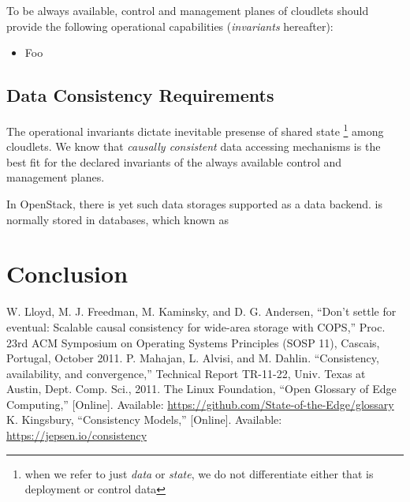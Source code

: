 \documentclass[conference]{IEEEtran}
\begin{document}
To be always available, control and management planes of cloudlets should
provide the following operational capabilities (\textit{invariants} hereafter):

\begin{itemize}
\item Foo
\end{itemize}

\subsection{Data Consistency Requirements}

The operational invariants dictate inevitable presense of shared state
\footnote{when we refer to just \textit{data} or \textit{state}, we do not
differentiate either that is deployment or control data} among cloudlets. We
know \cite{b4} that \textit{causally consistent} \cite{b1}\cite{b2}
data accessing mechanisms is the best fit for the declared invariants of the
always available control and management planes.

In OpenStack, there is yet such data storages supported as a data
backend. is normally stored in databases, which known as

\section{Conclusion}

\begin{thebibliography}{00}
 W. Lloyd, M. J. Freedman, M. Kaminsky, and D. G. Andersen, ``Don’t settle for eventual: Scalable causal consistency for wide-area storage with COPS,'' Proc. 23rd ACM Symposium on Operating Systems Principles (SOSP 11), Cascais, Portugal, October 2011.
 P. Mahajan, L. Alvisi, and M. Dahlin. ``Consistency, availability, and convergence,'' Technical Report TR-11-22, Univ. Texas at Austin, Dept. Comp. Sci., 2011.
 The Linux Foundation, ``Open Glossary of Edge Computing,'' [Online]. Available: \url{https://github.com/State-of-the-Edge/glossary}
 K. Kingsbury, ``Consistency Models,'' [Online]. Available: \url{https://jepsen.io/consistency}
\end{thebibliography}
\end{document}
